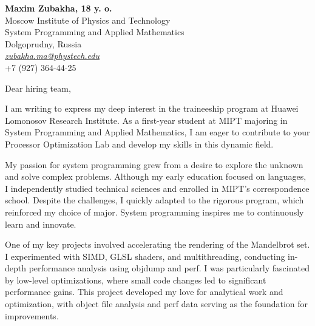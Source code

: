 \documentclass[11pt]{report}
\begin{document}
\begin{titlepage}

\begin{large}


\raggedright \textbf{Maxim Zubakha, 18 y. o.} \\ Moscow Institute of Physics and Technology \\ System Programming and Applied Mathematics \\ Dolgoprudny, Russia \\ \href{zubakha.ma@phystech.edu}{\textit{zubakha.ma@phystech.edu}} \\ +7 (927) 364-44-25 \\

\vspace{0.7em}

\raggedright Dear hiring team, \\

\vspace{0.7em}

I am writing to express my deep interest in the traineeship program at Huawei Lomonosov Research Institute. As a first-year student at MIPT majoring in System Programming and Applied Mathematics, I am eager to contribute to your Processor Optimization Lab and develop my skills in this dynamic field.

\vspace{0.7em}

My passion for system programming grew from a desire to explore the unknown and solve complex problems. Although my early education focused on languages, I independently studied technical sciences and enrolled in MIPT's correspondence school. Despite the challenges, I quickly adapted to the rigorous program, which reinforced my choice of major. System programming inspires me to continuously learn and innovate.

\vspace{0.7em}

One of my key projects involved accelerating the rendering of the Mandelbrot set. I experimented with SIMD, GLSL shaders, and multithreading, conducting in-depth performance analysis using objdump and perf. I was particularly fascinated by low-level optimizations, where small code changes led to significant performance gains. This project developed my love for analytical work and optimization, with object file analysis and perf data serving as the foundation for improvements.


\end{large}
\end{titlepage}
\end{document}
